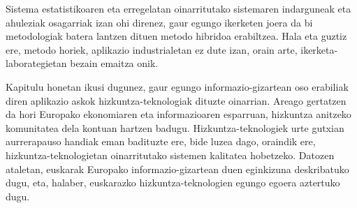 \begin{multicols}{2}
Sistema estatistikoaren eta erregelatan oinarritutako sistemaren indarguneak eta ahuleziak osagarriak izan ohi direnez, gaur egungo ikerketen joera da bi metodologiak batera lantzen dituen metodo hibridoa erabiltzea. Hala eta guztiz ere, metodo horiek, aplikazio industrialetan ez dute izan, orain arte, ikerketa-laborategietan bezain emaitza onik.

Kapitulu honetan ikusi dugunez, gaur egungo informazio-gizartean oso erabiliak diren aplikazio askok hizkuntza-teknologiak dituzte oinarrian. Areago gertatzen da hori Europako ekonomiaren eta informazioaren esparruan, hizkuntza anitzeko komunitatea dela kontuan hartzen badugu. Hizkuntza-teknologiek urte gutxian aurrerapauso handiak eman badituzte ere, bide luzea dago, oraindik ere, hizkuntza-teknologietan oinarritutako sistemen kalitatea hobetzeko. Datozen ataletan, euskarak Europako informazio-gizartean duen eginkizuna deskribatuko dugu, eta, halaber, euskarazko hizkuntza-teknologien egungo egoera aztertuko dugu. 
\end{multicols}

\clearpage



